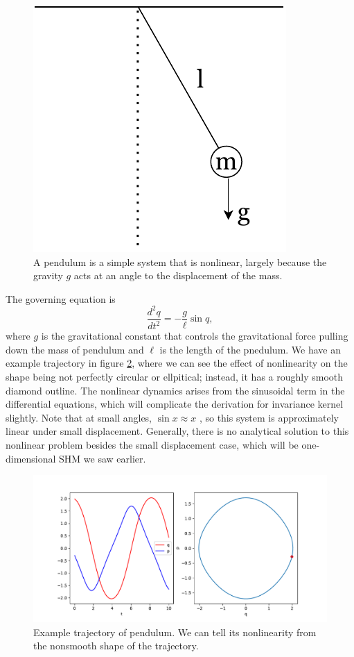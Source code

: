\documentclass{statsmsc}
\begin{document}
\begin{figure}[H]
        \centering
        \includegraphics[width=0.3\linewidth]{../figures/pendulum.pdf}
        \caption{A pendulum is a simple system that is nonlinear, largely because the gravity $g$ acts at an angle to the displacement of the mass.}
        \label{fig:pendulum_diagram}
\end{figure}

The governing equation is 
$$
\frac{d^2q}{dt^2}=-\frac{g}{\ell}\sin q, 
$$
where $g$ is the gravitational constant that controls the gravitational force pulling down the mass of pendulum and $\ell$ is the length of the pnedulum.
We have an example trajectory in figure \ref{fig:pendulum_trajectory}, where we can see the effect of nonlinearity on the shape being not perfectly circular or ellpitical; instead, it has a roughly smooth diamond outline. 
The nonlinear dynamics arises from the sinusoidal term in the differential equations, which will complicate the derivation for invariance kernel slightly. 
Note that at small angles, $\sin x \approx x$ , so this system is approximately linear under small displacement. 
Generally, there is no analytical solution to this nonlinear problem besides the small displacement case, which will be one-dimensional SHM we saw earlier.

\begin{figure}[H] 
  \includegraphics[width=0.7\linewidth]{../codes/figures/pendulum_trajectory_1D.pdf}
  \centering
  \caption{Example trajectory of pendulum. We can tell its nonlinearity from the nonsmooth shape of the trajectory.}
  \label{fig:pendulum_trajectory}
\end{figure}
\end{document}
